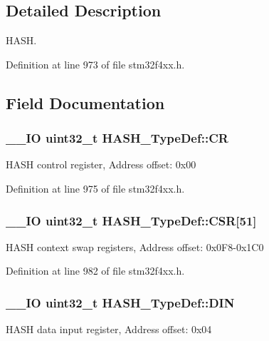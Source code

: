 \subsection{Detailed Description}
H\-A\-S\-H. 

Definition at line 973 of file stm32f4xx.\-h.



\subsection{Field Documentation}
\hypertarget{struct_h_a_s_h___type_def_adba940f3265121b77f9304b1843010ea}{
\subsubsection[{C\-R}]{\setlength{\rightskip}{0pt plus 5cm}\-\_\-\-\_\-\-I\-O {\bf uint32\-\_\-t} H\-A\-S\-H\-\_\-\-Type\-Def\-::\-C\-R}}\label{struct_h_a_s_h___type_def_adba940f3265121b77f9304b1843010ea}
H\-A\-S\-H control register, Address offset\-: 0x00 

Definition at line 975 of file stm32f4xx.\-h.

\hypertarget{struct_h_a_s_h___type_def_af7ae6bac0500d97592f523fdbc1e3e12}{
\subsubsection[{C\-S\-R}]{\setlength{\rightskip}{0pt plus 5cm}\-\_\-\-\_\-\-I\-O {\bf uint32\-\_\-t} H\-A\-S\-H\-\_\-\-Type\-Def\-::\-C\-S\-R\mbox{[}51\mbox{]}}}\label{struct_h_a_s_h___type_def_af7ae6bac0500d97592f523fdbc1e3e12}
H\-A\-S\-H context swap registers, Address offset\-: 0x0\-F8-\/0x1\-C0 

Definition at line 982 of file stm32f4xx.\-h.

\hypertarget{struct_h_a_s_h___type_def_ac4f283960465f7a1d318ed66d4b88f74}{
\subsubsection[{D\-I\-N}]{\setlength{\rightskip}{0pt plus 5cm}\-\_\-\-\_\-\-I\-O {\bf uint32\-\_\-t} H\-A\-S\-H\-\_\-\-Type\-Def\-::\-D\-I\-N}}\label{struct_h_a_s_h___type_def_ac4f283960465f7a1d318ed66d4b88f74}
H\-A\-S\-H data input register, Address offset\-: 0x04 

